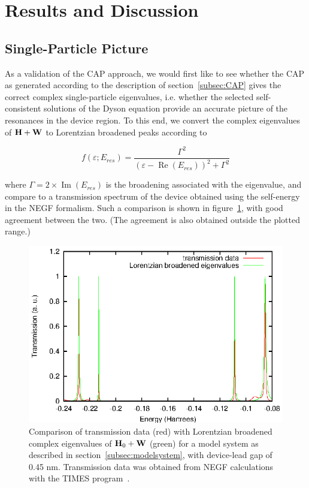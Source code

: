 \section{Results and Discussion}
\label{sec:results}

\subsection{Single-Particle Picture}
\label{subsec:SingleParticle}

As a validation of the CAP approach, we would first like to see whether the
CAP as generated according to the description of section~\ref{subsec:CAP} gives
the correct complex single-particle eigenvalues, i.e. whether the selected
self-consistent solutions of the Dyson equation provide an accurate picture of
the resonances in the device region. To this end, we convert the complex
eigenvalues of $\mathbf{H} + \mathbf{W}$ to Lorentzian broadened peaks according to

\begin{equation}
	f(\varepsilon;E_{res})
	= \frac{\Gamma^2}{(\varepsilon - \operatorname{Re}(E_{res}))^2 + \Gamma^2}
	\label{eq:lobro}
\end{equation}

where $\Gamma = 2 \times \operatorname{Im}(E_{res})$ is the broadening
associated with the eigenvalue, and compare to a transmission spectrum of the
device obtained using the self-energy in the NEGF formalism. Such a comparison
is shown in figure~\ref{fig:lobro-hwevals}, with good agreement between the
two. (The agreement is also obtained outside the plotted range.)

\begin{figure}
	\begin{center}
		\includegraphics[width=0.9\linewidth]{figures/4evals}
	\end{center}
	\caption{Comparison of transmission data (red) with Lorentzian
	broadened complex eigenvalues of $\mathbf{H}_0 + \mathbf{W}$ (green) for a
	model system as described in section~\ref{subsec:modelsystem}, with
	device-lead gap of 0.45 nm. Transmission data was obtained from NEGF
	calculations with the TIMES program~\cite{times}.}
	\label{fig:lobro-hwevals}
\end{figure}

